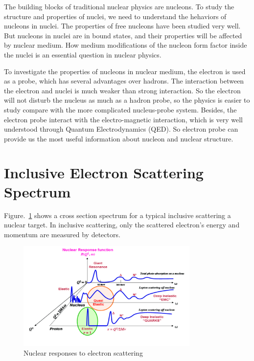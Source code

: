 The building blocks of traditional nuclear physics are nucleons. To study the structure and properties of nuclei, we
need to understand the hehaviors of nucleons in nuclei. The properties of free nucleons have been studied very well.
But nucleons in nuclei are in bound states, and their properties will be affected by nuclear medium.
How medium modifications of the nucleon form factor inside the nuclei is an essential question in nuclear physics.

To investigate the properties of nucleons in nuclear medium, the electron is used as a probe, which has several 
advantages over hadrons. The interaction between the electron and nuclei is much weaker than strong interaction.
So the electron will not disturb the nucleus as much as a hadron probe, so the physics is easier to study compare
with the more complicated nucleus-probe system.
Besides, the electron probe interact with the electro-magnetic interaction, which is very well understood through
Quantum Electrodynamics (QED). So electron probe can provide us the most useful information about nucleon and nuclear
structure.

\section{Inclusive Electron Scattering Spectrum}

Figure.~\ref{fig:scattering_spectrum}  shows a cross section spectrum for a typical inclusive scattering a nuclear target.
In inclusive scattering, only the scattered electron's energy and momentum are measured by detectors.

\begin{figure}[h]
\centering
\includegraphics[width=0.8\textwidth]{figs/scattering_spectrum.png}
\caption[scattering spectrum]{Nuclear responses to electron scattering \label{fig:scattering_spectrum}}
\end{figure}

